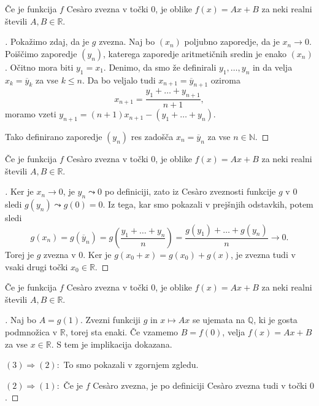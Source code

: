\documentclass[10]{beamer}
\newenvironment{dokaz}{\begin{proof}[\bfseries\upshape\proofname]}{\end{proof}}
\begin{document}
\begin{frame}
    \begin{block}{}
        Če je funkcija $f$ Ces\`{a}ro zvezna v točki $0$, je oblike $f(x) = Ax + B$ za neki realni števili $A, B \in \mathbb{R}$.
    \end{block}
    \begin{dokaz}\renewcommand{\qedsymbol}{}
        Pokažimo zdaj, da je $g$ zvezna. Naj bo $(x_n)$ poljubno zaporedje, da je $x_n \rightarrow 0$. Poiščimo zaporedje $(y_n)$, katerega zaporedje aritmetičnih sredin je enako $(x_n)$. 
        \pause
        Očitno mora biti $y_1 = x_1$. Denimo, da smo že definirali $y_1, \ldots, y_n$ in da velja $x_k = \overline{y}_k$ za vse $k \leq n$. Da bo veljalo tudi $x_{n+1} = \overline{y}_{n+1}$ oziroma 
        $$x_{n+1} = \frac{y_1 + \ldots + y_{n+1}}{n+1},$$ 
        moramo vzeti $y_{n+1} = (n+1)x_{n+1} - (y_1 + \ldots + y_n)$. 
        \pause
        
        Tako definirano zaporedje $(y_n)$ res zadošča $x_n = \overline{y}_n$ za vse $n \in \mathbb{N}$.
    \end{dokaz}
\end{frame}

\begin{frame}
    \begin{block}{}
        Če je funkcija $f$ Ces\`{a}ro zvezna v točki $0$, je oblike $f(x) = Ax + B$ za neki realni števili $A, B \in \mathbb{R}$.
    \end{block}
    \begin{dokaz}\renewcommand{\qedsymbol}{}
        Ker je $x_n \rightarrow 0$, je $y_n \leadsto 0$ po definiciji, zato iz Ces\`{a}ro zveznosti funkcije $g$ v $0$ sledi $g(y_n) \leadsto g(0) = 0$. 
        \pause
        Iz tega, kar smo pokazali v prejšnjih odstavkih, potem sledi 
        $$g(x_n) = g(\overline{y}_n) = g(\frac{y_1 + \ldots + y_n}{n}) = \frac{g(y_1) + \ldots + g(y_n)}{n} \rightarrow 0.$$
        Torej je $g$ zvezna v $0$. 
        \pause
        Ker je $g(x_0 + x) = g(x_0) + g(x)$, je zvezna tudi v vsaki drugi točki $x_0 \in \mathbb{R}$.
    \end{dokaz}
\end{frame}

\begin{frame}
    \begin{block}{}
        Če je funkcija $f$ Ces\`{a}ro zvezna v točki $0$, je oblike $f(x) = Ax + B$ za neki realni števili $A, B \in \mathbb{R}$.
    \end{block}
    \begin{dokaz}
        Naj bo $A = g(1)$. Zvezni funkciji $g$ in $x \mapsto Ax$ se ujemata na $\mathbb{Q}$, ki je gosta podmnožica v $\mathbb{R}$, torej sta enaki. Če vzamemo $B = f(0)$, velja $f(x) = Ax + B$ za vse $x \in \mathbb{R}$. S tem je implikacija dokazana.
        \pause

        \medskip
        $(3) \Rightarrow (2): $ To smo pokazali v zgornjem zgledu.
        \pause

        \medskip
        $(2) \Rightarrow (1): $ Če je $f$ Ces\`{a}ro zvezna, je po definiciji Ces\`{a}ro zvezna tudi v točki $0$.
    \end{dokaz}
\end{frame}
\end{document}
